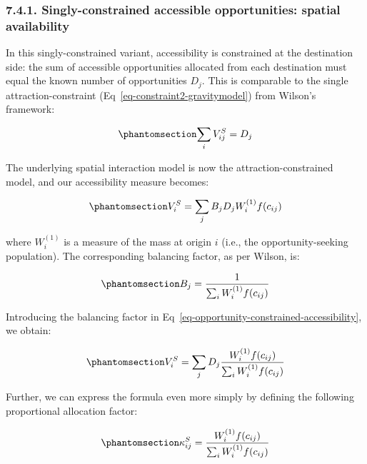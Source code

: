 \documentclass[
  10pt,
  letterpaper,
]{article}
\begin{document}
\subsubsection{7.4.1. Singly-constrained accessible opportunities:
spatial
availability}\label{singly-constrained-accessible-opportunities-spatial-availability}

In this singly-constrained variant, accessibility is constrained at the
destination side: the sum of accessible opportunities allocated from
each destination must equal the known number of opportunities \(D_j\).
This is comparable to the single attraction-constraint
(Eq~\ref{eq-constraint2-gravitymodel}) from Wilson's framework:

\begin{equation}\phantomsection\label{eq-opportunity-constraint}{
\sum_i V^S_{ij} =  D_j
}\end{equation}

The underlying spatial interaction model is now the
attraction-constrained model, and our accessibility measure becomes:

\begin{equation}\phantomsection\label{eq-opportunity-constrained-accessibility}{
V^S_{i} = \sum_j B_j D_j W_i^{(1)} f(c_{ij})
}\end{equation}

\noindent where \(W_i^{(1)}\) is a measure of the mass at origin \(i\)
(i.e., the opportunity-seeking population). The corresponding balancing
factor, as per Wilson, is:

\begin{equation}\phantomsection\label{eq-opportunity-constrained-proportionality-constants}{
B_j = \frac{1}{\sum_i W_i^{(1)} f(c_{ij})}
}\end{equation}

Introducing the balancing factor in
Eq~\ref{eq-opportunity-constrained-accessibility}, we obtain:

\begin{equation}\phantomsection\label{eq-opportunity-constrained-accessibility-with-balancing-factor}{
V^S_{i} = \sum_j D_j \frac{W_i^{(1)} f(c_{ij})}{\sum_i W_i^{(1)} f(c_{ij})}
}\end{equation}

Further, we can express the formula even more simply by defining the
following proportional allocation factor:

\begin{equation}\phantomsection\label{eq-opportunity-constrained-proportional-allocation-factor}{
\kappa^S_{ij} = \frac{W_i^{(1)} f(c_{ij})}{\sum_i W_i^{(1)} f(c_{ij})}
}\end{equation}
\end{document}
